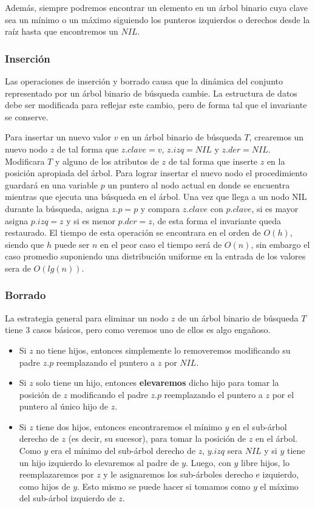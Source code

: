 Adem\'as, siempre podremos encontrar un elemento en un \'arbol binario cuya clave sea un m\'inimo o un m\'aximo siguiendo los punteros izquierdos o derechos desde la ra\'iz hasta que encontremos un $NIL$.

\subsubsection{Inserci\'on}

Las operaciones de inserci\'on y borrado causa que la din\'amica del conjunto representado por un \'arbol binario de b\'usqueda cambie. La estructura de datos debe ser modificada para reflejar este cambio, pero de forma tal que el invariante se conserve.

Para insertar un nuevo valor $v$ en un \'arbol binario de b\'usqueda $T$, crearemos un nuevo nodo $z$ de tal forma que $z.clave = v$, $z.izq = NIL$ y $z.der = NIL$. Modificara $T$ y alguno de los atributos de $z$ de tal forma que inserte $z$ en la posici\'on apropiada del \'arbol. Para lograr insertar el nuevo nodo el procedimiento guardar\'a en una variable $p$ un puntero al nodo actual en donde se encuentra mientras que ejecuta una b\'usqueda en el \'arbol. Una vez que llega a un nodo NIL durante la b\'usqueda, asigna $z.p = p$ y compara $z.clave$ con $p.clave$, si es mayor asigna $p.izq = z$ y si es menor $p.der = z$, de esta forma el invariante queda restaurado. El tiempo de esta operaci\'on se encontrara en el orden de $O(h)$, siendo que $h$ puede ser $n$ en el peor caso el tiempo ser\'a de $O(n)$, sin embargo el caso promedio suponiendo una distribuci\'on uniforme en la entrada de los valores sera de $O(lg(n))$.

\subsubsection{Borrado}

La estrategia general para eliminar un nodo $z$ de un \'arbol binario de b\'usqueda $T$ tiene $3$ casos b\'asicos, pero como veremos uno de ellos es algo enga\~noso.

\begin{itemize}
 \item Si $z$ no tiene hijos, entonces simplemente lo removeremos modificando su padre $z.p$ reemplazando el puntero a $z$ por $NIL$.
 \item Si $z$ solo tiene un hijo, entonces \textbf{elevaremos} dicho hijo para tomar la posici\'on de $z$ modificando el padre $z.p$ reemplazando el puntero a $z$ por el puntero al \'unico hijo de $z$.
 \item Si $z$ tiene dos hijos, entonces encontraremos el m\'inimo $y$ en el sub-\'arbol derecho de $z$ (es decir, su sucesor), para tomar la posici\'on de $z$ en el \'arbol. Como $y$ era el m\'inimo del sub-\'arbol derecho de $z$, $y.izq$ sera $NIL$ y si $y$ tiene un hijo izquierdo lo elevaremos al padre de $y$. Luego, con $y$ libre hijos, lo reemplazaremos por $z$ y le asignaremos los sub-\'arboles derecho e izquierdo, como hijos de $y$. Esto mismo se puede hacer si tomamos como $y$ el m\'aximo del sub-\'arbol izquierdo de $z$.
\end{itemize}

